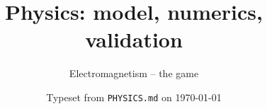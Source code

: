 \documentclass[10.5pt,a4paper]{article}
\title{Physics: model, numerics, validation}
\author{Electromagnetism -- the game}
\date{Typeset from \texttt{PHYSICS.md} on \today}
\begin{document}
\maketitle
\tableofcontents
\bigskip

\end{document}
